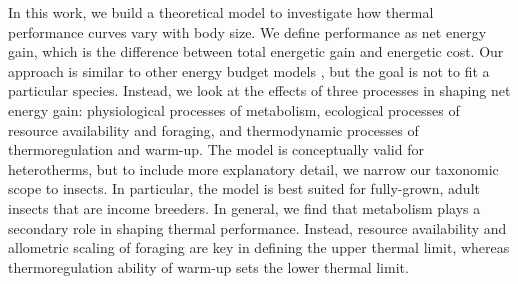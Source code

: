 In this work, we build a theoretical model to investigate how thermal performance curves vary with body size.  %
We define performance as net energy gain, which is the difference between total energetic gain and energetic cost. 
Our approach is similar to other energy budget models \citep[e.g. Niche Mapper\textsuperscript{TM} or][]{Kooijman2009}, but the goal is not to fit a particular species. %
Instead, we look at the effects of three processes in shaping net energy gain: physiological processes of metabolism, ecological processes of resource availability and foraging, and thermodynamic processes of thermoregulation and warm-up.  %
The model is conceptually valid for heterotherms, but to include more explanatory detail, we narrow our taxonomic scope to insects.
In particular, the model is best suited for fully-grown, adult insects that are income breeders. %
In general, we find that metabolism plays a secondary role in shaping thermal performance.
Instead, resource availability and allometric scaling of foraging are key in defining the upper thermal limit, whereas thermoregulation ability of warm-up sets the lower thermal limit.
